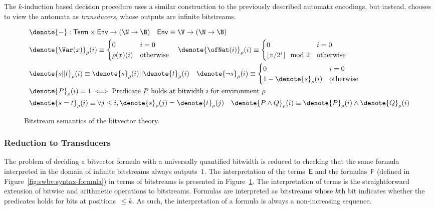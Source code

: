 The $k$-induction based decision procedure uses a similar construction to the
previously described automata encodings, but instead, chooses to view the
automata as \emph{transducers}, whose outputs are infinite bitstreams.

\begin{figure}[t]
\begin{align*}
&\denote{-}: \mathsf{Term} \times \mathsf{Env} \to (\N \to \B) \quad \mathsf{Env} \equiv \V \to (\N \to \B) \\
&\denote{\Var(x)}_\rho(i) \equiv
  \begin{cases}
  0 & i = 0 \\
  \rho(x)(i) & \text{otherwise}
  \end{cases}
\quad \denote{\ofNat(i)}_\rho(i) \equiv
  \begin{cases}
  0 & i = 0 \\
  \lfloor v / 2^i \rfloor \mod 2  & \text{otherwise}
  \end{cases} \\
&\denote{s || t}_\rho(i) \equiv \denote{s}_\rho(i) || \denote{t}_\rho(i)
\quad \denote{\lnot s}_\rho(i) \equiv
  \begin{cases}
    0 & i = 0 \\
    1 - \denote{s}_\rho(i) & \text{otherwise}
  \end{cases}  \\
&\denote{P}_\rho(i) = 1 \iff \text{Predicate $P$ holds at bitwidth $i$ for environment $\rho$} \\
&\denote{s = t}_\rho(i) \equiv \forall j \leq i, \denote{s}_\rho(j) = \denote{t}_\rho(j)
\quad \denote{P \land Q}_\rho(i) \equiv \denote{P}_\rho(i) \land \denote{Q}_\rho(i) \\
\end{align*}
  \caption{Bitstream semantics of the bitvector theory.}
\label{fig:swbv:stx-sem-bv-theory}
\end{figure}

\subsubsection{Reduction to Transducers}

The problem of deciding a bitvector formula with a universally quantified
bitwidth is reduced to checking that the same formula interpreted in the domain
of infinite bitstreams always outputs~$1$.
%
The interpretation of the terms~$\mathsf E$ and
the formulas~$\mathsf F$ (defined in Figure~\ref{fig:swbv:syntax-formula}) in terms
of bitstreams is presented in Figure~\ref{fig:swbv:stx-sem-bv-theory}.
%
The interpretation of terms is the straightforward extension of bitwise and
arithmetic operations to bitstreams. Formulas are interpreted as bitstreams
whose $k$th bit indicates whether the predicates holds for bits at
positions~$\leq k$.
%
As such, the interpretation of a formula is always a non-increasing sequence.

